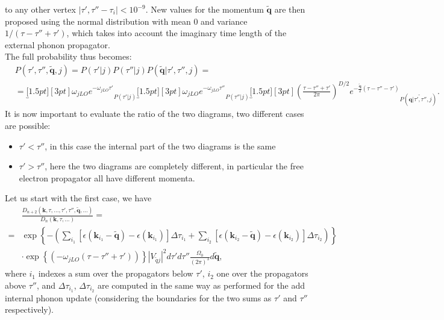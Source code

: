 to any other vertex $|\tau',\tau''-\tau_i|<10^{-9}$. New values for the momentum $\tilde{\mathbf{q}}$ are then proposed using the normal distribution 
with mean $0$ and variance $1/(\tau -\tau''+\tau')$, which takes into account the imaginary time length of the external phonon propagator.\\
The full probability thus becomes:
\begin{equation}
\begin{split}
    &P(\tau',\tau'',\tilde{\mathbf{q}},j)=P(\tau'|j)P(\tau''|j)P(\tilde{\mathbf{q}}|\tau',\tau'',j)=\\
    &=\underbracket[1.5pt][3pt]{\omega_{jLO}e^{-\omega_{jLO}\tau'}}_{P(\tau'|j)}\underbracket[1.5pt][3pt]{\omega_{jLO}e^{-\omega_{jLO}\tau''}}_{P(\tau''|j)}
    \underbracket[1.5pt][3pt]{\left(\frac{\tau-\tau''+\tau'}{2\pi}\right)^{D/2}e^{-\frac{\tilde{\mathbf{q}}}{2}(\tau-\tau''-\tau')}}_{P(\tilde{\mathbf{q}|\tau',\tau'',j})}.
\end{split}
\end{equation}
It is now important to evaluate the ratio of the two diagrams, two different cases are possible:
\begin{itemize}
    \item $\tau'<\tau''$, in this case the internal part of the two diagrams is the same
    \item $\tau'>\tau''$, here the two diagrams are completely different, in particular the free electron propagator all have different momenta.
\end{itemize}
Let us start with the first case, we have
\begin{equation}
\begin{split}
    &\frac{D_{n+2}(\mathbf{k},\tau,...,\tau',\tau'',\tilde{\mathbf{q}},...)}{D_n(\mathbf{k},\tau,...)}=\\
    =&\exp\left\{-\left(\sum_{i_1}\left[\epsilon(\mathbf{k}_{i_1}-\tilde{\mathbf{q}})-\epsilon(\mathbf{k}_{i_1})\right]\Delta\tau_{i_1}+\sum_{i_2}\left[\epsilon(\mathbf{k}_{i_2}-\tilde{\mathbf{q}})-\epsilon(\mathbf{k}_{i_2})\right]\Delta\tau_{i_2}\right)\right\}\\
    &\cdot\exp{\left\{\left(-\omega_{jLO}(\tau-\tau''+\tau')\right)\right\}}|V_{\tilde{q}j}|^2d\tau'd\tau''\frac{\Omega_0}{(2\pi)^3}d\tilde{\mathbf{q}},
\end{split}
\end{equation}
where $i_1$ indexes a sum over the propagators below $\tau'$, $i_2$ one over the propagators above $\tau''$, and $\Delta\tau_{i_1}$, $\Delta\tau_{i_2}$ 
are computed in the same way as performed for the add internal phonon update (considering the boundaries for the two sums as $\tau'$ and $\tau''$ respectively).\\
